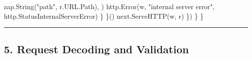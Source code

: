 \documentclass[
]{article}
\newenvironment{Shaded}{}{}
\newcommand{\NormalTok}[1]{#1}
\newcommand{\OperatorTok}[1]{\textcolor[rgb]{0.40,0.40,0.40}{#1}}
\newcommand{\StringTok}[1]{\textcolor[rgb]{0.25,0.44,0.63}{#1}}
\begin{document}
\begin{Shaded}
\begin{Highlighting}[]
\NormalTok{                        zap}\OperatorTok{.}\NormalTok{String}\OperatorTok{(}\StringTok{"path"}\OperatorTok{,}\NormalTok{ r}\OperatorTok{.}\NormalTok{URL}\OperatorTok{.}\NormalTok{Path}\OperatorTok{),}
                    \OperatorTok{)}
\NormalTok{                    http}\OperatorTok{.}\NormalTok{Error}\OperatorTok{(}\NormalTok{w}\OperatorTok{,} \StringTok{"internal server error"}\OperatorTok{,}\NormalTok{ http}\OperatorTok{.}\NormalTok{StatusInternalServerError}\OperatorTok{)}
                \OperatorTok{\}}
            \OperatorTok{\}()}
\NormalTok{            next}\OperatorTok{.}\NormalTok{ServeHTTP}\OperatorTok{(}\NormalTok{w}\OperatorTok{,}\NormalTok{ r}\OperatorTok{)}
        \OperatorTok{\})}
    \OperatorTok{\}}
\OperatorTok{\}}
\end{Highlighting}
\end{Shaded}

\begin{center}\rule{0.5\linewidth}{0.5pt}\end{center}

\hypertarget{request-decoding-and-validation}{%
\subsection{5. Request Decoding and
Validation}\label{request-decoding-and-validation}}
\end{document}
